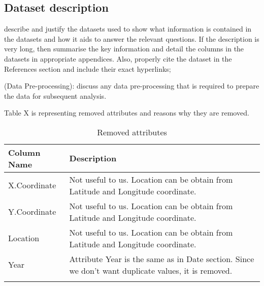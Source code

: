 \subsection{Dataset description}\label{subsection}
describe and justify the datasets used to show what information is contained in the datasets and how it aids to answer the relevant questions. If the description is very long, then summarise the key information and detail the columns in the datasets in appropriate appendices. Also, properly cite the dataset in the References section and include their exact hyperlinks; \newline

(Data Pre-processing): discuss any data pre-processing that is required to prepare the data for subsequent analysis. 

Table X is representing removed attributes and reasons why they are removed.

\begin{center}
    \begin{longtable}{|m{10em}|m{21em}|}
        \hline
            Column Name & 
            Description \\
        \hline
            X.Coordinate & 
            Not useful to us. Location can be obtain from Latitude and Longitude coordinate.\\
        \hline
            Y.Coordinate & 
            Not useful to us. Location can be obtain from Latitude and Longitude coordinate.\\
        \hline
            Location & 
            Not useful to us. Location can be obtain from Latitude and Longitude coordinate.\\
        \hline
            Year & 
            Attribute Year is the same as in Date section. Since we don't want duplicate values, it is removed.\\
        \hline
    \caption{Removed attributes}
\end{longtable}
\end{center}

